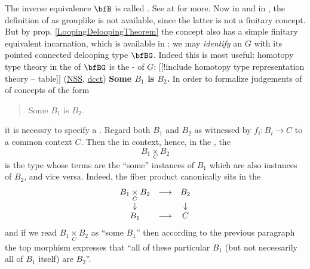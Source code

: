 The inverse equivalence $\bfB$ is called . See at  for more.
Now in  and in , the definition of  as grouplike  is not available, since the latter is not a finitary concept. But by prop. \ref{LoopingDeloopingTheorem} the concept also has a simple finitary equivalent incarnation, which is available in : we may \emph{identify} an  $G$ with its pointed connected delooping type $\bfBG$.
Indeed this is most useful: homotopy type theory in the  of $\bfBG$ is the - of $G$:
[[!include homotopy type representation theory -- table]]
(\hyperlink{NSS}{NSS}, \hyperlink{dcct}{dcct})
\textbf{Some $B_1$ is $B_2$.}
In order to formalize judgements of  of concepts of the form
\begin{quote}%
Some $B_1$ is $B_2$.
\end{quote}
it is necessry to specify a . Regard both $B_1$ and $B_2$ as  witnessed by 
$f_i \colon B_i \longrightarrow C$
to a common context $C$. Then the  in context, hence, in the , the 
\begin{displaymath}
B_1 \underset{C}{\times} B_2
\end{displaymath}
is the type whose terms are the ``some'' instances of $B_1$ which are also instances of $B_2$, and vice versa. Indeed, the fiber product canonically sits in the  
\begin{displaymath}
\begin{matrix}
B_1 \underset{C}{\times} B_2
&\longrightarrow&
B_2
\\
\downarrow && \downarrow
\\
B_1 &\longrightarrow& C
\end{matrix}
\end{displaymath}
and if we read $B_1 \underset{C}{\times} B_2$ as ``some $B_1$'' then according to the previous paragraph the top morphism expresses that ``all of these particular $B_1$ (but not necessarily all of $B_1$ itself) are $B_2$''.
